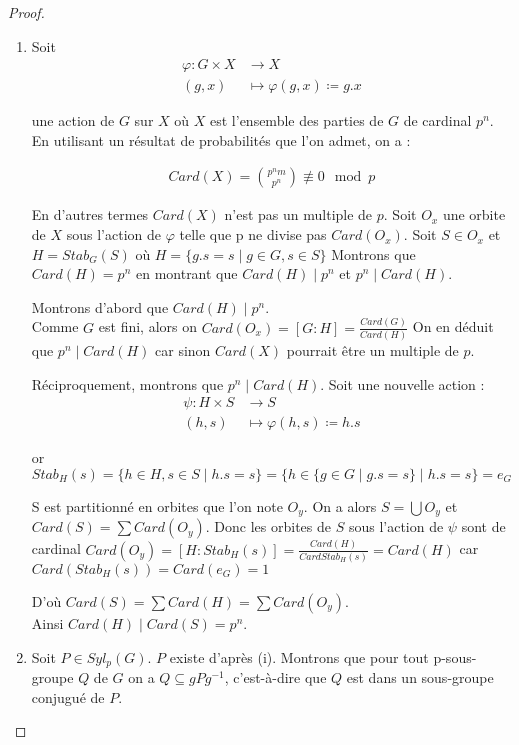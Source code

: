 \documentclass[french]{article}
\theoremstyle{definition}
\theoremstyle{plain}
\theoremstyle{plain}
\theoremstyle{plain}
\theoremstyle{plain}
\theoremstyle{plain}
\begin{document}
\begin{proof}
	\begin{enumerate}[label={\upshape(\roman*)}]
		\item Soit
\begin{align*}
	\varphi : G \times X &\to X \\
	(g,x) &\mapsto \varphi(g,x) \coloneq g.x
\end{align*}

une action de \( G \) sur \( X \) où \( X \) est l'ensemble des parties de \( G \) de cardinal \( p^{n} \). En utilisant un résultat de probabilités que l'on admet, on a :

\begin{align*}
	Card(X) = \binom{p^{n}m}{p^{n}} \not\equiv 0 \mod  p 
\end{align*}


En d'autres termes \( Card(X) \) n'est pas un multiple de \( p \).
Soit \( O_{x} \) une orbite de \( X \) sous l'action de \( \varphi \) telle que  p ne divise pas \( Card(O_{x}) \). Soit \( S \in O_{x} \) et \( H = Stab_{G}({S}) \) où 
\( H = \{ g.s = s \mid g \in G, s \in S \} \)
Montrons que \( Card(H) = p^{n} \) en montrant que \( Card(H) \mid p^{n} \) et \( p^{n} \mid Card(H) \).

\par Montrons d'abord que \( Card(H) \mid p^{n} \). \\ 
Comme \( G \) est fini, alors on \( Card(O_{x}) = [G : H]  = \frac{Card(G)}{Card(H)} \)
On en déduit que \( p^{n} \mid Card(H) \) car sinon \( Card(X) \) pourrait être un multiple de \( p \).

\par Réciproquement, montrons que \( p^{n} \mid Card(H) \). Soit une nouvelle action :
\begin{align*}
	\psi : H \times S &\to S \\
	(h,s) &\mapsto \varphi(h,s) \coloneq h.s
\end{align*}

or \( Stab_{H}({s}) = \{ h \in H, s \in S \mid h.s = s \} = \{ h \in \{g \in G \mid g.s = s \} \mid h.s = s \} = {e_{G}} \)

S est partitionné en orbites que l'on note \( O_y \). On a alors \( S = \bigcup O_{y} \) et 
\( Card(S) = \sum Card(O_{y}) \).
Donc les orbites de \( S \) sous l'action de \( \psi \) sont de cardinal \( Card(O_y) = [H : Stab_{H}({s}) ] = \frac{Card(H)}{Card{Stab_{H}({s})}} = Card(H) \) car \( Card(Stab_{H}({s})) = Card(e_{G}) = 1 \)

D'où \( Card(S) = \sum Card(H) = \sum Card(O_{y}) \). \\
Ainsi \( Card(H) \mid Card(S) = p^{n} \).

\item Soit \( P \in Syl_{p}({G}) \). \( P \) existe d'après (i). Montrons que pour tout p-sous-groupe \( Q \) de \( G \) on a \( Q \subseteq gPg^{-1} \), c'est-à-dire que \( Q \) est dans un sous-groupe conjugué de \( P \).

	\end{enumerate}
\end{proof}
\end{document}
